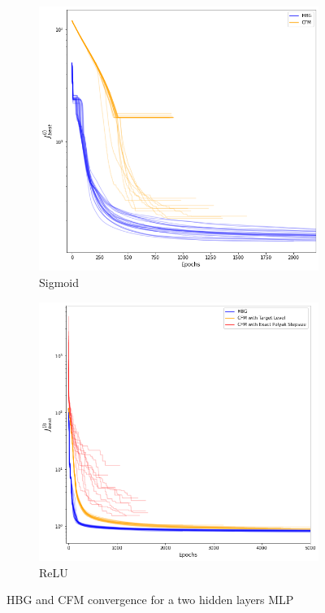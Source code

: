 \begin{figure}[htbp]
    \centering
    \begin{subfigure}{.5\textwidth}
        \centering
        \includegraphics[width=.9\textwidth]{images/h2_sigmoid.png}
        \caption{Sigmoid}
        \label{fig:h2_sigmoid}
    \end{subfigure}%
    \begin{subfigure}{.5\textwidth}
        \centering
        \includegraphics[width=.9\textwidth]{images/h2_relu.png}
        \caption{ReLU}
        \label{fig:h2_relu}
    \end{subfigure}
    \caption{HBG and CFM convergence for a two hidden layers MLP}
    \label{fig:h2}
\end{figure}

